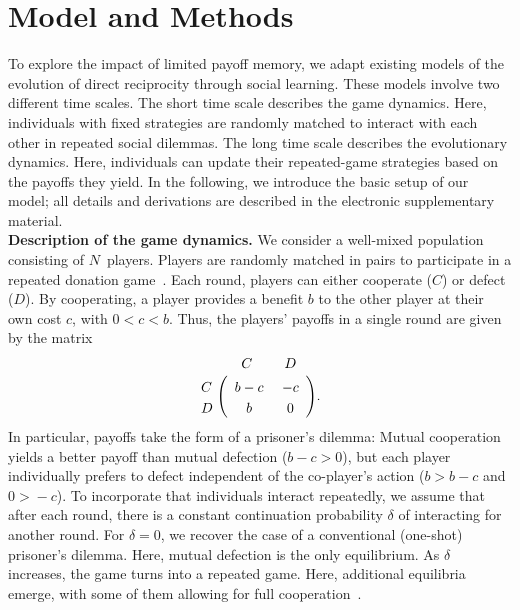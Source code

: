 \documentclass[11pt]{article}
\def\esm{electronic supplementary material}
\theoremstyle{plainCl1}
\theoremstyle{plainCl2}
\begin{document}


\section{Model and Methods}\label{section:model}


To explore the impact of limited payoff memory, we adapt existing models of the evolution of direct reciprocity through social learning. 
These models involve two different time scales. 
The short time scale describes the game dynamics. 
Here, individuals with fixed strategies are randomly matched to interact with each other in repeated social dilemmas. 
The long time scale describes the evolutionary dynamics. 
Here, individuals can update their repeated-game strategies based on the payoffs they yield. 
In the following, we introduce the basic setup of our model; all details and derivations are described in the \esm.\\


\noindent
{\bf Description of the game dynamics.} We consider a well-mixed population consisting of $N$~players.
Players are randomly matched in pairs to participate in a repeated donation game~\citep{sigmund2010calculus}.
Each round, players can either cooperate (\(C\)) or defect (\(D\)). 
By cooperating, a player provides a benefit \(b\) to the other player at their own cost \(c\), with \(0 \!<\! c \!<\! b\). 
Thus, the players' payoffs in a single round are given by the matrix
\begin{align}
\bordermatrix{%
	& C & D \cr
C &\ b-c &\ -c\  \cr
D &\ b &\ 0\ \cr
} .
\end{align}
In particular, payoffs take the form of a prisoner's dilemma:
Mutual cooperation yields a better payoff than mutual defection ($b\!-\!c\!>\!0$), but each player individually prefers to defect independent of the co-player's action ($b\!>\!b\!-\!c$ and $0\!>\!-c$). 
To incorporate that individuals interact repeatedly, we assume that after each round, there is a constant continuation probability $\delta$ of interacting for another round. 
For $\delta\!=\!0$, we recover the case of a conventional (one-shot) prisoner's dilemma. 
Here, mutual defection is the only equilibrium. 
As $\delta$ increases, the game turns into a repeated game. Here, additional equilibria emerge, with some of them allowing for full cooperation~\citep{friedman:RES:1971,Akin:chapter:2016,hilbe:GEB:2015,stewart:pnas:2014}. 
\end{document}
